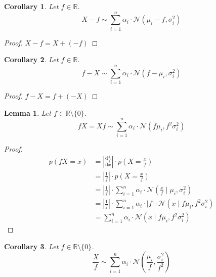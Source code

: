 \documentclass[11pt]{article}
\newtheorem{lemma}{Lemma}
\newtheorem{corollary}{Corollary}
\begin{document}
\begin{corollary}
  Let $f \in \mathbb{R}$.
  \begin{equation*}
    X - f \sim \sum_{i = 1}^{n} \alpha_{i} \cdot \mathcal{N}(\mu_{i} - f, \sigma_{i}^{2})
  \end{equation*}
\end{corollary}

\begin{proof}
  $X - f = X + (-f)$
\end{proof}

\begin{corollary}
  Let $f \in \mathbb{R}$.
  \begin{equation*}
    f - X \sim \sum_{i = 1}^{n} \alpha_{i} \cdot \mathcal{N}(f - \mu_{i}, \sigma_{i}^{2})
  \end{equation*}
\end{corollary}

\begin{proof}
  $f - X = f + (-X)$
\end{proof}

\begin{lemma}
  Let $f \in \mathbb{R} \setminus \{ 0 \}$.
  \begin{equation*}
    fX = Xf \sim \sum_{i = 1}^{n} \alpha_{i} \cdot \mathcal{N}(f\mu_{i}, f^{2}\sigma_{i}^{2})
  \end{equation*}
\end{lemma}

\begin{proof}
  \begin{align*}
    p(fX = x) & = \left| \frac{\mathrm{d}\frac{x}{f}}{\mathrm{d}x} \right| \cdot p\left( X = \frac{x}{f} \right)\\
              & = \left|\frac{1}{f}\right| \cdot p\left( X = \frac{x}{f} \right)\\
              & = \left|\frac{1}{f}\right| \cdot \sum_{i = 1}^{n} \alpha_{i} \cdot \mathcal{N}\left(\frac{x}{f} \mid \mu_{i}, \sigma_{i}^{2}\right)\\
              & = \left|\frac{1}{f}\right| \cdot \sum_{i = 1}^{n} \alpha_{i} \cdot |f| \cdot \mathcal{N}\left(x \mid f\mu_{i}, f^{2}\sigma_{i}^{2}\right)\\
              & = \sum_{i = 1}^{n} \alpha_{i} \cdot \mathcal{N}\left(x \mid f\mu_{i}, f^{2}\sigma_{i}^{2}\right)
  \end{align*}
\end{proof}

\begin{corollary}
  Let $f \in \mathbb{R} \setminus \{ 0 \}$.
  \begin{equation*}
    \frac{X}{f} \sim \sum_{i = 1}^{n} \alpha_{i} \cdot \mathcal{N}\left( \frac{\mu_{i}}{f}, \frac{\sigma_{i}^{2}}{f^{2}} \right)
  \end{equation*}
\end{corollary}
\end{document}
